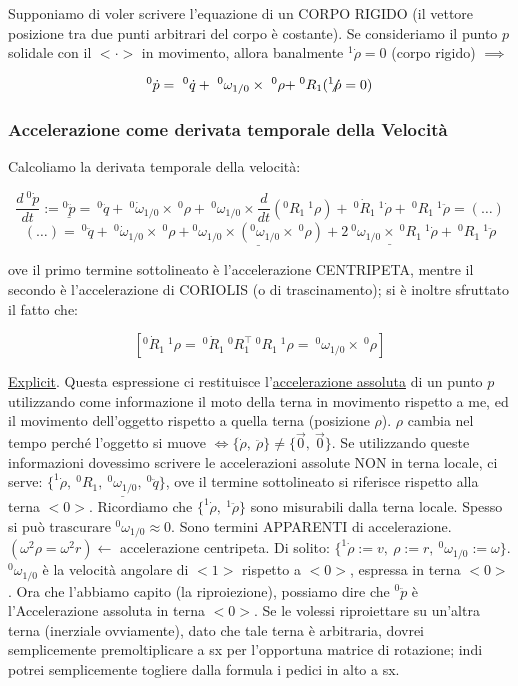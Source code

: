 Supponiamo di voler scrivere l'equazione di un CORPO RIGIDO (il vettore posizione tra due punti arbitrari del corpo è costante). Se consideriamo il punto $p$ solidale con il $<\mathord{\cdot}>$ in movimento, allora banalmente $^1\dot{\rho}=0$ (corpo rigido) $\implies$

\[
	^0\dot{p} =\ ^0\dot{q} +\ ^0\omega_{1/0}\times\ ^0\rho + \centernot{^0R_1(^1\dot{\rho} = 0)}
\]

\subsubsection{Accelerazione come derivata temporale della Velocità}

Calcoliamo la derivata temporale della velocità:

\[
	\frac{d\ ^0\dot{p}}{dt} := \underline{^0\ddot{p}} =\ ^0\ddot{q} +\ ^0\dot{\omega}_{1/0}\times\ ^0\rho +\ ^0\omega_{1/0}\times \frac{d}{dt}(^0R_1\ ^1\rho) +\ ^0\dot{R}_1\ ^1\dot{\rho} +\ ^0R_1\ ^1\ddot{\rho} = (\dots)
\]
\[
	(\dots) =\ ^0\ddot{q} +\ ^0\dot{\omega}_{1/0}\times\ ^0\rho + \underline{^0\omega_{1/0}\times(^0\omega_{1/0}\times\ ^0\rho)} + \underline{2\ ^0\omega_{1/0}\times\ ^0R_1\ ^1\dot{\rho}} +\ ^0R_1\ ^1\ddot{\rho}
\]

ove il primo termine sottolineato è l'accelerazione CENTRIPETA, mentre il secondo è l'accelerazione di CORIOLIS (o di trascinamento); si è inoltre sfruttato il fatto che:

\[
	[^0\dot{R}_1\ ^1\rho =\ ^0\dot{R}_1\ ^0R_1^\top\ ^0R_1\ ^1\rho =\ ^0\omega_{1/0}\times\ ^0\rho]
\]

\underline{Explicit}. Questa espressione ci restituisce l'\underline{accelerazione assoluta} di un punto $p$ utilizzando come informazione il moto della terna in movimento rispetto a me, ed il movimento dell'oggetto rispetto a quella terna (posizione $\rho$). $\rho$ cambia nel tempo perché l'oggetto si muove $\iff \{\dot{\rho},\ \ddot{\rho}\}\neq \{\vec{0},\ \vec{0}\}$. Se utilizzando queste informazioni dovessimo scrivere le accelerazioni assolute NON in terna locale, ci serve: $\{^1\dot{\rho},\ ^0R_1,\ \underline{^0\omega_{1/0}},\ ^0\ddot{q}\}$, ove il termine sottolineato si riferisce rispetto alla terna $<0>$. Ricordiamo che $\{^1\dot{\rho},\ ^1\ddot{\rho}\}$ sono misurabili dalla terna locale. Spesso si può trascurare $^0\omega_{1/0}\approx 0$. Sono termini APPARENTI di accelerazione. $(\omega^2\rho = \omega^2 r) \leftarrow$ accelerazione centripeta. Di solito: $\{^1\dot{\rho}:=v,\ \rho:=r,\ ^0\omega_{1/0}:=\omega\}$. $^0\omega_{1/0}$ è la velocità angolare di $<1>$ rispetto a $<0>$, espressa in terna $<0>$. Ora che l'abbiamo capito (la riproiezione), possiamo dire che $^0\ddot{p}$ è l'Accelerazione assoluta in terna $<0>$. Se le volessi riproiettare su un'altra terna (inerziale ovviamente), dato che tale terna è arbitraria, dovrei semplicemente premoltiplicare a sx per l'opportuna matrice di rotazione; indi potrei semplicemente togliere dalla formula i pedici in alto a sx.

